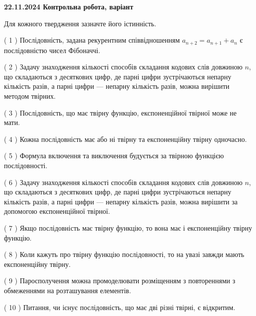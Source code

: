 \documentclass[12pt, ukrainian]{article}
\begin{document}
\vspace{4mm}
\newpage
\begin {large}

\textbf{22.11.2024 Контрольна робота, варіант  }\par


{
Для кожного твердження зазначте його істинність.\par
\vspace{2mm}
( 1 ) Послідовність, задана рекурентним співвідношенням $a_{n+2}=a_{n+1}+a_{n}$ є послідовністю чисел Фібоначчі.%

( 2 ) Задачу знаходження кількості способів складання кодових слів довжиною $n$, що складаються з десяткових цифр, де парні цифри зустрічаються непарну кількість разів, а парні цифри — непарну кількість разів, можна вирішити методом твірних.%

( 3 ) Послідовність, що має твірну функцію, експоненційної твірної може не мати.%

( 4 ) Кожна послідовність має або ні твірну та експоненційну твірну одночасно.%

( 5 ) Формула включення та виключення будується за твірною функцією послідовності.%

( 6 ) Задачу знаходження кількості способів складання кодових слів довжиною $n$, що складаються з десяткових цифр, де парні цифри зустрічаються непарну кількість разів, а парні цифри — непарну кількість разів, можна вирішити за допомогою експоненційної твірної.%

( 7 ) Якщо послідовність має твірну функцію, то вона має і експоненційну твірну функцію.%

( 8 ) Коли кажуть про твірну функцію послідовності, то на увазі завжди мають експоненційну твірну.%

( 9 ) Паросполучення можна промоделювати розміщенням з повтореннями з обмеженнями на розташування елементів.%

( 10 ) Питання, чи існує послідовність, що має дві різні твірні, є відкритим.%


\vspace{5mm}
}
\end {large}
\end{document}
